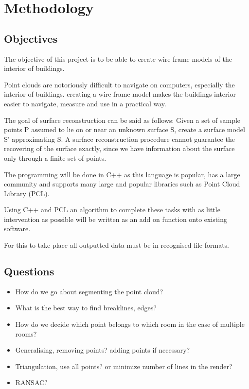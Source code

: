 



\section{Methodology}

\subsection{Objectives}

The objective of this project is to be able to create wire frame models of the interior of buildings.

Point clouds are notoriously difficult to navigate on computers, especially the interior of buildings. creating a wire frame model makes the buildings interior easier to navigate, measure and use in a practical way.

The goal of surface reconstruction can be said as follows: Given a set of sample points P assumed to lie on or near an unknown surface S, create a surface model S' approximating S.
A surface reconstruction procedure cannot guarantee the recovering of the surface exactly, since we have information about the surface only through a finite set of points.

The programming will be done in C++ as this language is popular, has a large community and supports many large and popular libraries such as Point Cloud Library (PCL). 

Using C++ and PCL an algorithm to complete these tasks with as little intervention as possible will be written as an add on function onto existing software.

For this to take place all outputted data must be in recognised file formats.


\subsection{Questions}
\begin{itemize}

\item How do we go about segmenting the point cloud?

\item What is the best way to find breaklines, edges?

\item How do we decide which point belongs to which room in the case of multiple rooms?

\item Generalising, removing points? adding points if necessary?

\item Triangulation, use all points? or minimize number of lines in the render?

\item RANSAC?

\end{itemize}


